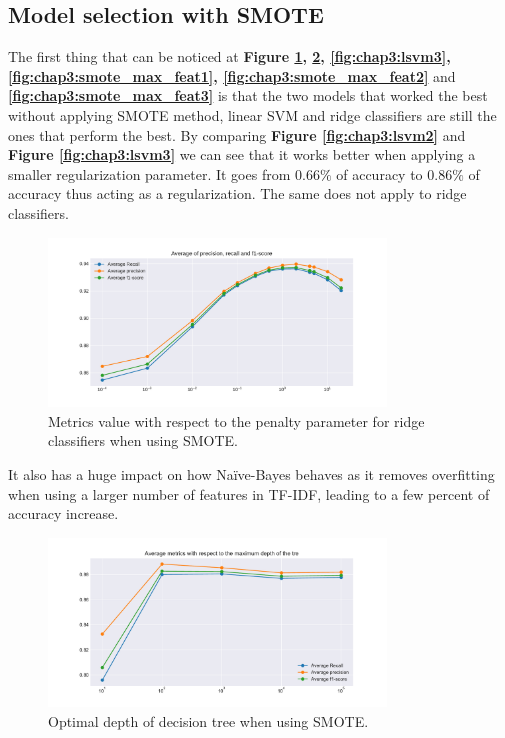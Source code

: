 \subsection{Model selection with SMOTE}
The first thing that can be noticed at \textbf{Figure \ref{fig:chap3:ridge3}, \ref{fig:chap3:dt3}, \ref{fig:chap3:lsvm3}, \ref{fig:chap3:smote_max_feat1}, \ref{fig:chap3:smote_max_feat2}} and \textbf{\ref{fig:chap3:smote_max_feat3}} is that the two models that worked the best without applying SMOTE method, linear SVM and ridge classifiers are still the ones that perform the best. By comparing \textbf{Figure \ref{fig:chap3:lsvm2}} and \textbf{Figure \ref{fig:chap3:lsvm3}} we can see that it works better when applying a smaller regularization parameter. It goes from $0.66\%$ of accuracy to  $0.86\%$ of accuracy thus acting as a regularization. The same does not apply to ridge classifiers. \\
\begin{figure}
 \centering
 \includegraphics[width=0.8\textwidth]{images/chapitre3/ridge+smote}
 \caption{Metrics value with respect to the penalty parameter for ridge classifiers when using SMOTE.}
 \label{fig:chap3:ridge3}
\end{figure}
It also has a huge impact on how Na\"{i}ve-Bayes behaves as it removes overfitting when using a larger number of features in TF-IDF, leading to a few percent of accuracy increase. \\
\begin{figure}
 \centering
 \includegraphics[width=0.8\textwidth]{images/chapitre3/fake-dt-SMOTE}
 \caption{Optimal depth of decision tree when using SMOTE.}
 \label{fig:chap3:dt3}
\end{figure}
